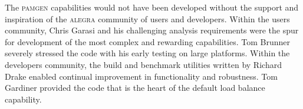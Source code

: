 The \textsc{pamgen} capabilities would not have been developed without the support and inspiration of the \textsc{alegra} community of users and developers. Within the users community, Chris Garasi and his challenging analysis requirements were the spur for development of the most complex and rewarding capabilities. Tom Brunner severely stressed the code with his early testing on large platforms. Within the developers community, the build and benchmark utilities written by Richard Drake enabled continual improvement in functionality and robustness. Tom Gardiner provided the code that is the heart of the default load balance capability.

